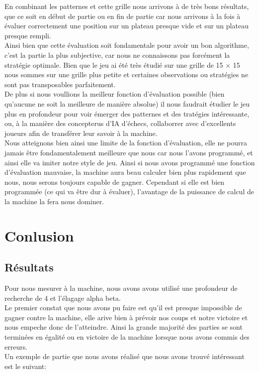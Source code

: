\documentclass{article}
\begin{document}
En combinant les patternes et cette grille nous arrivons à de très bons résultats, que ce soit en début de partie ou en fin de partie car nous arrivons
à la fois à évaluer correctement une position sur un plateau presque vide et sur un plateau presque rempli.\\

Ainsi bien que cette évaluation soit fondamentale pour avoir un bon algorithme, c'est la partie la plus subjective, car nous ne connaissons pas forcément 
la stratégie optimale. Bien que le jeu ai été très étudié sur une grille de 15 $\times$ 15 nous sommes sur une grille plus petite et certaines observations
ou stratégies ne sont pas transposables parfaitement.\\
De plus si nous voullions la meilleur fonction d'évaluation possible (bien qu'aucune ne soit la meilleure de manière absolue) il nous faudrait
étudier le jeu plus en profondeur pour voir émerger des patternes et des tratégies intéressante, ou, à la manière des concepterus d'IA d'échecs, collaborrer
avec d'excellents joueurs afin de transférer leur savoir à la machine.\\

Nous atteignons bien ainsi une limite de la fonction d'évaluation, elle ne pourra jamais être fondamentalement meilleure que nous car nous l'avons
programmé, et ainsi elle va imiter notre style de jeu. Ainsi si nous avons programmé une fonction d'évaluation mauvaise, la machine aura beau calculer bien 
plus rapidement que nous, nous serons toujours capable de gagner. Cependant si elle est bien programmée (ce qui va être dur à évaluer), l'avantage de la puissance
de calcul de la machine la fera nous dominer.

\pagebreak
\section{Conlusion}
\subsection{Résultats}

Pour nous mesurer à la machine, nous avons avons utilisé une profondeur de recherche de 4 et l'élagage alpha beta.\\
Le premier constat que nous avons pu faire est qu'il est presque impossible de gagner contre la machine, elle arive bien à prévoir nos coups
et notre victoire et nous empeche donc de l'atteindre. Ainsi la grande majorité des parties se sont terminées en égalité ou en victoire
de la machine lorsque nous avons commis des erreurs.\\
Un exemple de partie que nous avons réalisé que nous avons trouvé intéressant est le suivant:
\end{document}
